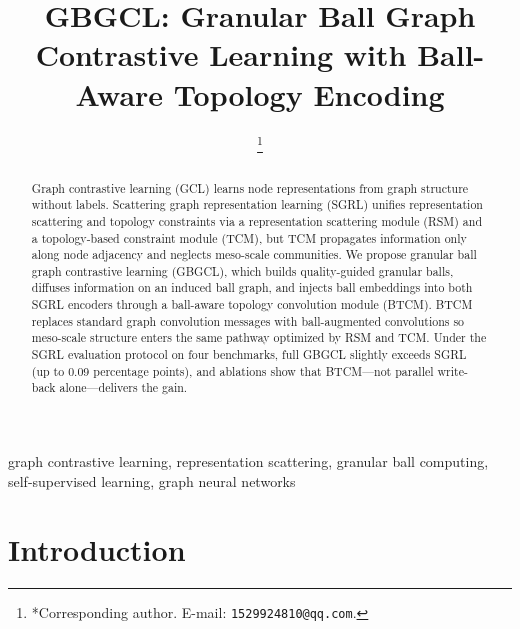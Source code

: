 \documentclass[conference]{IEEEtran}
\begin{document}
\title{GBGCL: Granular Ball Graph Contrastive Learning with Ball-Aware Topology Encoding}

\author{
\thanks{*Corresponding author. E-mail: \texttt{1529924810@qq.com}.}}

\maketitle

\begin{abstract}
Graph contrastive learning (GCL) learns node representations from graph structure without labels.
Scattering graph representation learning (SGRL) unifies representation scattering and topology constraints via a representation scattering module (RSM) and a topology-based constraint module (TCM), but TCM propagates information only along node adjacency and neglects meso-scale communities.
We propose granular ball graph contrastive learning (GBGCL), which builds quality-guided granular balls, diffuses information on an induced ball graph, and injects ball embeddings into both SGRL encoders through a ball-aware topology convolution module (BTCM).
BTCM replaces standard graph convolution messages with ball-augmented convolutions so meso-scale structure enters the same pathway optimized by RSM and TCM.
Under the SGRL evaluation protocol on four benchmarks, full GBGCL slightly exceeds SGRL (up to 0.09 percentage points), and ablations show that BTCM---not parallel write-back alone---delivers the gain.
\end{abstract}

\begin{IEEEkeywords}
graph contrastive learning, representation scattering, granular ball computing, self-supervised learning, graph neural networks
\end{IEEEkeywords}

\section{Introduction}
\label{sec:intro}
\end{document}
